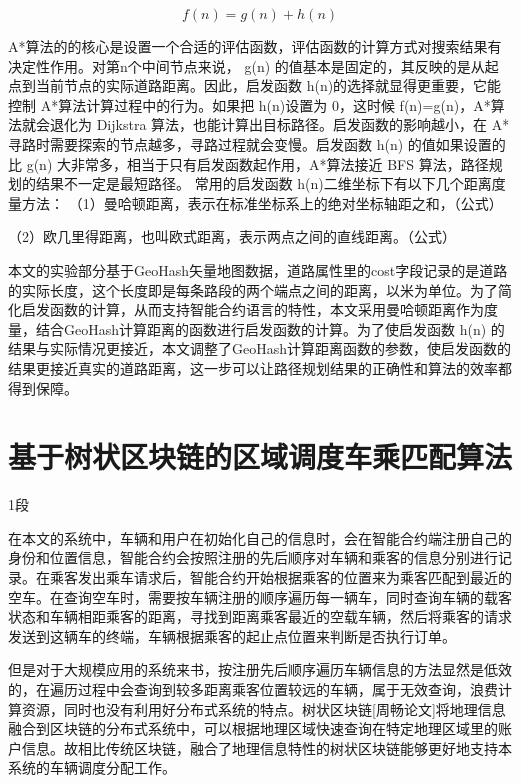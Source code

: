 \begin{equation}
  \label{eqn:calCost}
  f(n)=g(n)+h(n)
\end{equation}

A*算法的的核心是设置一个合适的评估函数，评估函数的计算方式对搜索结果有决定性作用。对第n个中间节点来说， g(n) 的值基本是固定的，其反映的是从起点到当前节点的实际道路距离。因此，启发函数 h(n)的选择就显得更重要，它能控制 A*算法计算过程中的行为。如果把 h(n)设置为 0，这时候 f(n)=g(n)，A*算法就会退化为 Dijkstra 算法，也能计算出目标路径。启发函数的影响越小，在 A*寻路时需要探索的节点越多，寻路过程就会变慢。启发函数 h(n) 的值如果设置的比 g(n) 大非常多，相当于只有启发函数起作用，A*算法接近 BFS 算法，路径规划的结果不一定是最短路径。
常用的启发函数 h(n)二维坐标下有以下几个距离度量方法：
（1）曼哈顿距离，表示在标准坐标系上的绝对坐标轴距之和，（公式）

（2）欧几里得距离，也叫欧式距离，表示两点之间的直线距离。（公式）

本文的实验部分基于GeoHash矢量地图数据，道路属性里的cost字段记录的是道路的实际长度，这个长度即是每条路段的两个端点之间的距离，以米为单位。为了简化启发函数的计算，从而支持智能合约语言的特性，本文采用曼哈顿距离作为度量，结合GeoHash计算距离的函数进行启发函数的计算。为了使启发函数 h(n) 的结果与实际情况更接近，本文调整了GeoHash计算距离函数的参数，使启发函数的结果更接近真实的道路距离，这一步可以让路径规划结果的正确性和算法的效率都得到保障。


\section{基于树状区块链的区域调度车乘匹配算法}1段

在本文的系统中，车辆和用户在初始化自己的信息时，会在智能合约端注册自己的身份和位置信息，智能合约会按照注册的先后顺序对车辆和乘客的信息分别进行记录。在乘客发出乘车请求后，智能合约开始根据乘客的位置来为乘客匹配到最近的空车。在查询空车时，需要按车辆注册的顺序遍历每一辆车，同时查询车辆的载客状态和车辆相距乘客的距离，寻找到距离乘客最近的空载车辆，然后将乘客的请求发送到这辆车的终端，车辆根据乘客的起止点位置来判断是否执行订单。

但是对于大规模应用的系统来书，按注册先后顺序遍历车辆信息的方法显然是低效的，在遍历过程中会查询到较多距离乘客位置较远的车辆，属于无效查询，浪费计算资源，同时也没有利用好分布式系统的特点。树状区块链[周畅论文]将地理信息融合到区块链的分布式系统中，可以根据地理区域快速查询在特定地理区域里的账户信息。故相比传统区块链，融合了地理信息特性的树状区块链能够更好地支持本系统的车辆调度分配工作。

